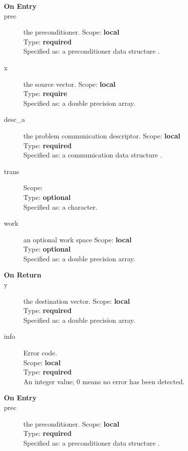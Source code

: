 \begin{description}
\item[\bf On Entry]
\item[prec] the preconditioner.
Scope: {\bf local} \\
Type: {\bf required}\\
Specified as: a preconditioner data structure \precdata.
\item[x] the source vector.
Scope: {\bf local} \\
Type: {\bf require}\\
Specified as: a double precision array.
\item[desc\_a] the problem communication descriptor.
Scope: {\bf local} \\
Type: {\bf required}\\
Specified as: a communication data structure \descdata.
\item[trans] 
Scope: {\bf } \\
Type: {\bf optional}\\
Specified as: a character.
\item[work] an optional work space
Scope: {\bf local} \\
Type: {\bf optional}\\
Specified as: a double precision array.
\end{description}

\begin{description}
\item[\bf On Return]
\item[y] the destination vector.
Scope: {\bf local} \\
Type: {\bf required}\\
Specified as: a double precision array.
\item[info] Error code.\\
Scope: {\bf local} \\
Type: {\bf required} \\
An integer value; 0 means no error has been detected. 
\end{description}





\begin{description}
\item[\bf On Entry]
\item[prec] the preconditioner.
Scope: {\bf local} \\
Type: {\bf required}\\
Specified as: a preconditioner data structure \precdata.
\end{description}



